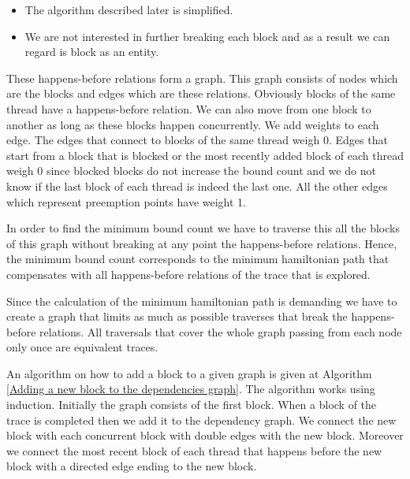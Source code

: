 \begin{itemize}
    \item The algorithm described later is simplified.
    \item We are not interested in further breaking each block and as a result we can regard is block as an entity.
\end{itemize}

These happens-before relations form a graph. This graph consists of nodes which are the blocks and edges which are these
relations. Obviously blocks of the same thread have a happens-before relation. We can also move from one block to another as long as these blocks happen
concurrently. We add weights to each edge. The edges that connect to blocks of the same thread weigh 0. Edges that start from a block that 
is blocked or the most recently added block of each thread weigh 0 since blocked blocks do not increase the bound count and we do not know if the last block of
each thread is indeed the last one. All the other edges which represent preemption points have weight 1.

In order to find the minimum bound count we have to traverse this all the blocks of this graph without breaking at any point the happens-before relations. 
Hence, the minimum bound count corresponds to the minimum hamiltonian path that compensates with all happens-before relations of the trace that is explored.

Since the calculation of the minimum hamiltonian path is demanding we have to create a graph that limits as much as possible traverses that break the happens-before
relations. All traversals that cover the whole graph passing from each node only once are equivalent traces. 

\noindent An algorithm on how to add a block to a given graph is given at Algorithm \ref{Adding a new block to the dependencies graph}. 
The algorithm works using induction.
Initially the graph consists of the first block. When a block of the trace is completed then we add it to the dependency graph. We connect the new block with each 
concurrent block with double edges with the new block. Moreover we connect the most recent block of each thread that happens before the new block with a directed edge
ending to the new block. 

